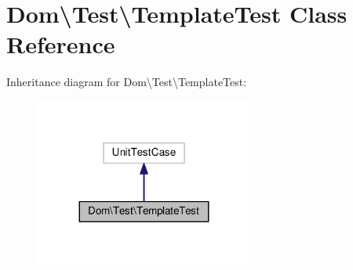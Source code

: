 \hypertarget{classDom_1_1Test_1_1TemplateTest}{\section{Dom\textbackslash{}Test\textbackslash{}Template\+Test Class Reference}
\label{classDom_1_1Test_1_1TemplateTest}
}


Inheritance diagram for Dom\textbackslash{}Test\textbackslash{}Template\+Test\+:\nopagebreak
\begin{figure}[H]
\begin{center}
\leavevmode
\includegraphics[width=203pt]{classDom_1_1Test_1_1TemplateTest__inherit__graph}
\end{center}
\end{figure}
